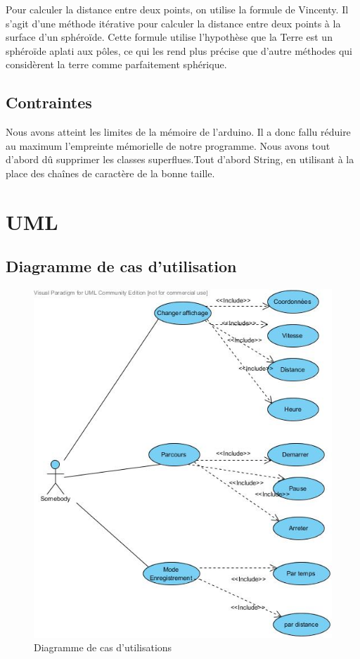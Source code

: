\documentclass[a4paper,12pt,titlepage]{article}
\begin{document}
Pour calculer la distance entre deux points, on utilise la formule de Vincenty.
Il s'agit d'une méthode itérative pour calculer la distance entre deux points à la surface d'un sphéroïde.
Cette formule utilise l'hypothèse que la Terre est un sphéroïde aplati aux pôles, ce qui les rend plus précise que d'autre méthodes qui considèrent la terre comme parfaitement sphérique.



\subsection{Contraintes}

Nous avons atteint les limites de la mémoire de l'arduino. Il a donc fallu réduire au maximum l'empreinte mémorielle de notre programme.
Nous avons tout d'abord dû supprimer les classes superflues.Tout d'abord String, en utilisant à la place des chaînes de caractère de la bonne taille.


\section{UML}

\subsection{Diagramme de cas d'utilisation}

\begin{figure}[H]
	\centering
	\includegraphics[width=\textwidth]{use_case.jpg}
	\caption{Diagramme de cas d'utilisations}
	\label{usecase}
\end{figure}
\end{document}
